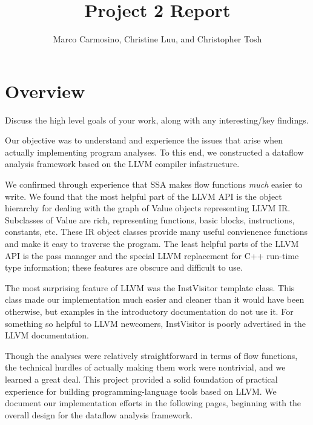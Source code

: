 \documentclass{article}
\title{Project 2 Report}
\author{Marco Carmosino, Christine Luu, and Christopher Tosh}
\theoremstyle{definition}
\begin{document}
\maketitle


\section{Overview}
\begin{framed}
  Discuss the high level goals of your work, along with any
  interesting/key findings.
\end{framed}

Our objective was to understand and experience the issues that arise
when actually implementing program analyses. To this end, we
constructed a dataflow analysis framework based on the LLVM compiler
infastructure.

We confirmed through experience that SSA makes flow functions
\emph{much} easier to write. We found that the most helpful part of
the LLVM API is the object hierarchy for dealing with the graph of
Value objects representing LLVM IR. Subclasses of Value are rich,
representing functions, basic blocks, instructions, constants,
etc. These IR object classes provide many useful convienence functions
and make it easy to traverse the program. The least helpful parts of
the LLVM API is the pass manager and the special LLVM replacement for
C++ run-time type information; these features are obscure and
difficult to use.

The most surprising feature of LLVM was the InstVisitor template
class. This class made our implementation much easier and cleaner than
it would have been otherwise, but examples in the introductory
documentation do not use it. For something so helpful to LLVM
newcomers, InstVisitor is poorly advertised in the LLVM documentation.

Though the analyses were relatively straightforward in terms of flow
functions, the technical hurdles of actually making them work were
nontrivial, and we learned a great deal. This project provided a solid
foundation of practical experience for building programming-language
tools based on LLVM. We document our implementation efforts in the
following pages, beginning with the overall design for the dataflow
analysis framework. 

\end{document}
